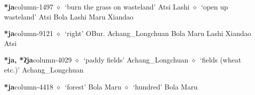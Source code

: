   \item {\footnotesize \textbf{*ja}}{\tiny column-1497}
         $\diamond$~`burn the grass on wasteland'
         Atsi 
\hspace{1ex}
         Lashi 
\hspace{1ex}
         $\diamond$~`open up wasteland'
         Atsi 
\hspace{1ex}
         Bola 
\hspace{1ex}
         Lashi 
\hspace{1ex}
         Maru 
\hspace{1ex}
         Xiandao 
  \item {\footnotesize \textbf{*ja}}{\tiny column-9121}
         $\diamond$~`right'
         OBur. 
\hspace{1ex}
         Achang\_Longchuan 
\hspace{1ex}
         Bola 
\hspace{1ex}
         Maru 
\hspace{1ex}
         Lashi 
\hspace{1ex}
         Xiandao 
\hspace{1ex}
         Atsi 
  \item {\footnotesize \textbf{*ja, *ʔja}}{\tiny column-4029}
         $\diamond$~`paddy fields'
         Achang\_Longchuan 
\hspace{1ex}
         $\diamond$~`fields (wheat etc.)'
         Achang\_Longchuan 
  \item {\footnotesize \textbf{*ja}}{\tiny column-4418}
         $\diamond$~`forest'
         Bola 
\hspace{1ex}
         Maru 
\hspace{1ex}
         $\diamond$~`hundred'
         Bola 
\hspace{1ex}
         Maru 
\hspace{1ex}
